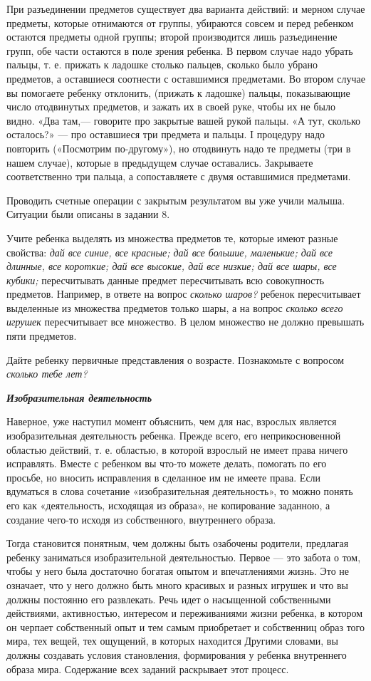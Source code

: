 \documentclass{book}
\renewcommand{\emph}[1]{\textit{#1}}
\begin{document}
При разъединении предметов существует два варианта действий: и мерном
случае предметы, которые отнимаются от группы, убираются совсем и перед
ребенком остаются предметы одной группы; второй производится лишь
разъединение групп, обе части остаются в поле зрения ребенка. В первом
случае надо убрать пальцы, т. е. прижать к ладошке столько пальцев,
сколько было убрано предметов, а оставшиеся соотнести с оставшимися
предметами. Во втором случае вы помогаете ребенку отклонить, (прижать к
ладошке) пальцы, показывающие число отодвинутых предметов, и зажать их в
своей руке, чтобы их не было видно. «Два там,--- говорите про закрытые
вашей рукой пальцы. «А тут, сколько осталось?» --- про оставшиеся три
предмета и пальцы. I процедуру надо повторить («Посмотрим по-другому»),
но отодвинуть надо те предметы (три в нашем случае), которые в
предыдущем случае оставались. Закрываете соответственно три пальца, а
сопоставляете с двумя оставшимися предметами.

Проводить счетные операции с закрытым результатом вы уже учили малыша.
Ситуации были описаны в задании 8.

Учите ребенка выделять из множества предметов те, которые имеют разные
свойства: \emph{дай все синие, все красные; дай все большие, маленькие;
дай все длинные, все короткие; дай все высокие, дай все низкие; дай все
шары, все кубики;} пересчитывать данные предмет пересчитывать всю
совокупность предметов. Например, в ответе на вопрос \emph{сколько
шаров?} ребенок пересчитывает выделенные из множества предметов только
шары, а на вопрос \emph{сколько всего игрушек} пересчитывает все
множество. В целом множество не должно превышать пяти предметов.

Дайте ребенку первичные представления о возрасте. Познакомьте с вопросом
\emph{сколько тебе лет?}

\emph{\textbf{Изобразительная деятельность}}

Наверное, уже наступил момент объяснить, чем для нас, взрослых является
изобразительная деятельность ребенка. Прежде всего, его неприкосновенной
областью действий, т. е. областью, в которой взрослый не имеет права
ничего исправлять. Вместе с ребенком вы что-то можете делать, помогать
по его просьбе, но вносить исправления в сделанное им не имеете права.
Если вдуматься в слова сочетание «изобразительная деятельность», то
можно понять его как «деятельность, исходящая из образа», не копирование
заданною, а создание чего-то исходя из собственного, внутреннего образа.

Тогда становится понятным, чем должны быть озабочены родители, предлагая
ребенку заниматься изобразительной деятельностью. Первое --- это забота
о том, чтобы у него была достаточно богатая опытом и впечатлениями
жизнь. Это не означает, что у него должно быть много красивых и разных
игрушек и что вы должны постоянно его развлекать. Речь идет о насыщенной
собственными действиями, активностью, интересом и переживаниями жизни
ребенка, в котором он черпает собственный опыт и тем самым приобретает и
собственниц образ того мира, тех вещей, тех ощущений, в которых
находится Другими словами, вы должны создавать условия становления,
формирования у ребенка внутреннего образа мира. Содержание всех заданий
раскрывает этот процесс.
\end{document}
